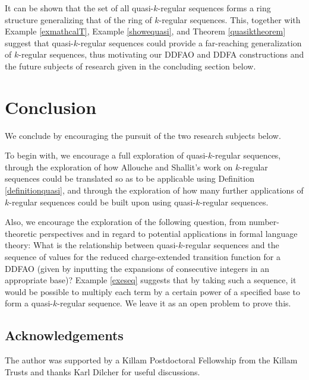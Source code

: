 \documentclass[12pt]{article}
\begin{document}
 It can be shown that the set of all quasi-$k$-regular sequences
 forms a ring structure generalizing that of the ring of $k$-regular sequences. 
 This, together with 
 Example \ref{exmathcalT}, Example \ref{showequasi}, and 
 Theorem \ref{quasiktheorem} 
 suggest that quasi-$k$-regular sequences could provide a far-reaching generalization
 of $k$-regular sequences, thus motivating our DDFAO and DDFA constructions 
 and the future subjects of research given in the concluding section below. 

\section{Conclusion}
 We conclude by encouraging the pursuit of the two research subjects below. 

 To begin with, we encourage a full exploration of quasi-$k$-regular sequences, 
 through the exploration of how Allouche and Shallit's work on $k$-regular sequences
 \cite[\S16]{AlloucheShallit2003} \cite{AlloucheShallit1992} could be translated so as to be applicable using 
 Definition \ref{definitionquasi}, and through the exploration 
 of how many further applications of $k$-regular sequences could be built upon 
 using quasi-$k$-regular sequences. 

 Also, we encourage the exploration of the following question, 
 from number-theoretic perspectives and in regard to potential applications in formal language theory:
 What is the relationship between quasi-$k$-regular sequences and the 
 sequence of values for the reduced charge-extended transition function 
 for a DDFAO (given by inputting the expansions of consecutive integers in an appropriate base)? 
 Example \ref{exeseq} suggests that by taking such a sequence, 
 it would be possible to multiply each term by a certain power of a specified base 
 to form a quasi-$k$-regular sequence. We leave it as an open problem to prove this. 

\subsection*{Acknowledgements}
 The author was supported by a Killam Postdoctoral Fellowship from the Killam Trusts and thanks Karl Dilcher
 for useful discussions. 
 
\end{document}
